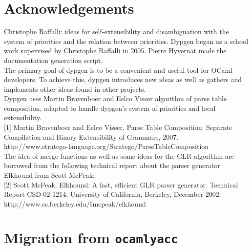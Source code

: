 \documentclass[12pt]{article}
\begin{document}
{\appendix

\section{Acknowledgements}

Christophe Raffalli: ideas for self-extensibility and disambiguation with the system of priorities and the relation between priorities. Dypgen began as a school work supervised by Christophe Raffalli in 2005. Pierre Hyvernat made the documentation generation script.\\

The primary goal of dypgen is to be a convenient and useful tool for OCaml developers. To achieve this, dypgen introduces new ideas as well as gathers and implements other ideas found in other projects.\\

Dypgen uses Martin Bravenboer and Eelco Visser algorithm of parse table composition, adapted to handle dypgen's system of priorities and local extensibility.\\

[1] Martin Bravenboer and Eelco Visser, Parse Table Composition: Separate Compilation and Binary Extensibility of Grammars, 2007.\\

http://www.stratego-language.org/Stratego/ParseTableComposition\\

The idea of merge functions as well as some ideas for the GLR algorithm are borrowed from the following technical report about the parser generator Elkhound from Scott McPeak:\\

[2] Scott McPeak. Elkhound: A fast, efficient GLR parser generator. Technical Report CSD-02-1214, University of California, Berkeley, December 2002.\\

http://www.cs.berkeley.edu/\~smcpeak/elkhound\\

\section{Migration from \texttt{ocamlyacc}}

}
\end{document}
